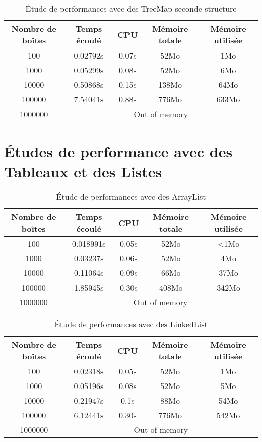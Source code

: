 \begin{table}[htbp]
  \centering
\begin{tabular}{|c|c|c|c|c|}
\hline
Nombre de boîtes & Temps écoulé & CPU & Mémoire totale & Mémoire utilisée\\
\hline
100 & 0.02792s & 0.07s & 52Mo & 1Mo\\
\hline
1000 & 0.05299s & 0.08s & 52Mo & 6Mo\\
\hline
10000 & 0.50868s & 0.15s & 138Mo & 64Mo\\
\hline
100000 & 7.54041s & 0.88s & 776Mo & 633Mo\\
\hline
1000000 & \multicolumn{4}{|c|}{Out of memory}\\
\hline
\end{tabular}
\caption{Étude de performances avec des TreeMap seconde structure}
\label{tab:treemap2}
\end{table}
\clearpage
\section{Études de performance avec des Tableaux et des Listes}

\begin{table}[h]
  \centering
\begin{tabular}{|c|c|c|c|c|}
\hline
Nombre de boîtes & Temps écoulé & CPU & Mémoire totale & Mémoire utilisée\\
\hline
100 & 0.018991s & 0.05s & 52Mo & <1Mo\\
\hline
1000 & 0.03237s & 0.06s & 52Mo & 4Mo\\
\hline
10000 & 0.11064s & 0.09s & 66Mo & 37Mo\\
\hline
100000 & 1.85945s & 0.30s & 408Mo & 342Mo\\
\hline
1000000 & \multicolumn{4}{|c|}{Out of memory}\\
\hline
\end{tabular}
\caption{Étude de performances avec des ArrayList}
 \label{tab:arraylist}
\end{table}

\begin{table}[htbp]
  \centering
\begin{tabular}{|c|c|c|c|c|}
\hline
Nombre de boîtes & Temps écoulé & CPU & Mémoire totale & Mémoire utilisée\\
\hline
100 & 0.02318s & 0.05s & 52Mo & 1Mo\\
\hline
1000 & 0.05196s & 0.08s & 52Mo & 5Mo\\
\hline
10000 & 0.21947s & 0.1s & 88Mo & 54Mo\\
\hline
100000 & 6.12441s & 0.30s & 776Mo & 542Mo\\
\hline
1000000 & \multicolumn{4}{|c|}{Out of memory}\\
\hline
\end{tabular}
\caption{Étude de performances avec des LinkedList}
\label{tab:linkedlist}
\end{table}
\clearpage




